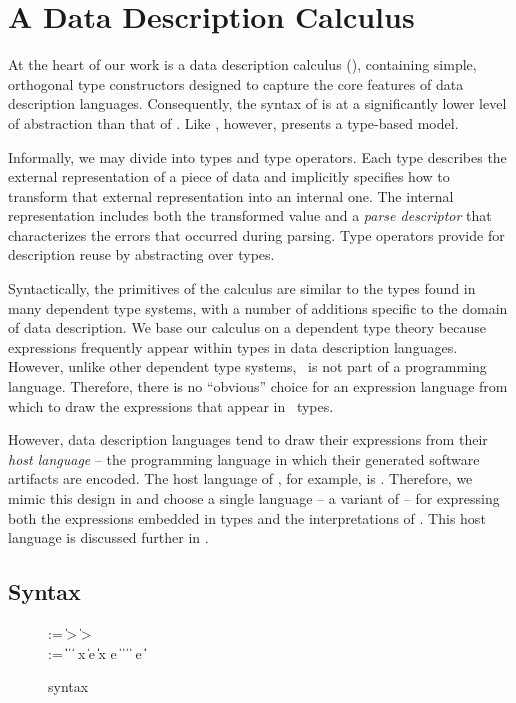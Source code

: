 \section{A Data Description Calculus}
\label{sec:ddc}

At the heart of our work is a data description calculus (\ddc{}),
containing simple, orthogonal type constructors designed to capture
the core features of data description languages.  Consequently, the
syntax of \ddc{} is at a significantly lower level of abstraction than
that of \padsml{}.  Like \padsml{}, however, \ddc{} presents a
type-based model.  

Informally, we may divide \ddc{} into types and
type operators. Each \ddc{} type describes the external representation
of a piece of data and implicitly specifies how to transform that
external representation into an internal one.  The internal
representation includes both the transformed value and a \textit{parse
  descriptor} that characterizes the errors that occurred during
parsing. Type operators provide for description reuse by abstracting
over types.

Syntactically, the primitives of the calculus are similar to the types
found in many dependent type systems, with a number of additions
specific to the domain of data description.  We base our calculus on a
dependent type theory because expressions frequently appear within
types in data description languages. However, unlike other dependent
type systems, \ddc\ is not part of a programming language.  Therefore,
there is no ``obvious'' choice for an expression language from which
to draw the expressions that appear in \ddc\ types.

However, data description languages tend to draw their expressions
from their {\em host language} -- the programming language in which
their generated software artifacts are encoded.  The host language of
\padsml, for example, is \ocaml. Therefore, we mimic this design in
\ddc and choose a single language -- a variant of \fomega -- for
expressing both the expressions embedded in types and the
interpretations of \ddc. This host language is discussed further in
.

\subsection{\ddca{} Syntax}
\label{sec:ddc-syntax}

\begin{figure}
\begin{bnf}
   \meta{\gk} \::= \kty \| \ity \-> \gk 
                               \| \kty \-> \gk \\
   \meta{\ty} \::= 
    \ptrue\| \pfalse \|  \| 
    \plam{\var}{\ity}{\ty} \|  \nlalt
    \psig x \ty \ty \| \psum \ty e \ty \| \pand \ty \ty \|
    \pset x \ty e \| \pseq \ty {} \nlalt
    \ptyvar       \| \pmu{\ptyvar}{\gk}{\ty} \| \ptylam{\ptyvar}{\kty}{\ty} \| \ptyapp{\ty}{\ty}
    \nlalt \pcompute e \ity \| \pabsorb \ty \| \pscan{\ty}  
\end{bnf}
\caption{\ddc{} syntax}
\label{fig:ddca-syntax}
\end{figure}

